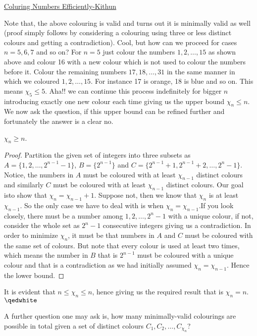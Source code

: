 \begin{problem}{6}{\href{https://artofproblemsolving.com/community/c6h2718707p34335433}{Coluring Numbers Efficiently-Kithun}}
\begin{solution}
	Note that, the above colouring is valid and turns out it is minimally valid as well (proof simply follows by considering a colouring using three or less distinct colours and getting a contradiction). Cool, but how can we proceed for cases $n=5,6,7$ and so on? For $n=5$ just colour the numbers $1,2,\dots,15$ as shown above and colour 16 with a new colour which is not used to colour the numbers before it. Colour the remaining numbers $17,18,\dots,31$ in the same manner in which we coloured $1,2,\dots,15$. For instance 17 is orange, 18 is blue and so on. This means $\chi_5 \leq 5$. Aha!! we can continue this process indefinitely for bigger $n$ introducing exactly one new colour each time giving us the upper bound $\chi_n \leq n$. We now ask the question, if this upper bound can be refined further and 
fortunately the answer is a clear no.
	\begin{numclaim}{1}
		$\chi_n \geq n$.  
	\end{numclaim}
	\begin{proof} Partition the given set of integers into three subsets as 
$A=\{1,2,\dots,2^{n-1}-1\}$, $B=\{2^{n-1}\}$ and 
$C=\{2^{n-1}+1,2^{n-1}+2,\dots,2^n-1\}$. Notice, the numbers in $A$ must be coloured with at least $\chi_{n-1}$ distinct colours and similarly $C$ must be coloured with at least $\chi_{n-1}$ distinct colours. Our goal isto show that $\chi_n=\chi_{n-1}+1$. Suppose not, then we know that $\chi_n$ is at least $\chi_{n-1}$. So the only case we have to deal with is when $\chi_n=\chi_{n-1}$.If you look closely, there must be a number among $1,2,\dots,2^n-1$ with a unique colour, if not, consider the whole set as $2^n-1$ consecutive integers giving us a contradiction. In order to minimize $\chi_n$, it must be that numbers in $A$ and $C$ must be coloured with the same set of 
colours. But note that every colour is used at least two times, which means the number in $B$ that is $2^{n-1}$ must be coloured with a unique colour and that is a contradiction as we had initially assumed $\chi_n = \chi_{n-1}$. Hence the lower bound.
	\end{proof}

	\noindent It is evident that $n \leq \chi_n \leq n$, hence giving us the required result that is $\chi_n = n$. $\qedwhite$

	\begin{remark}[title=Open Problem.$\hspace{1mm}$] A further question one may ask is, how many minimally-valid colourings are possible in total given a set of distinct colours $C_1, C_2, \dots, C_{\chi_n}$?
	\end{remark}	
	\end{solution}
\end{problem}


